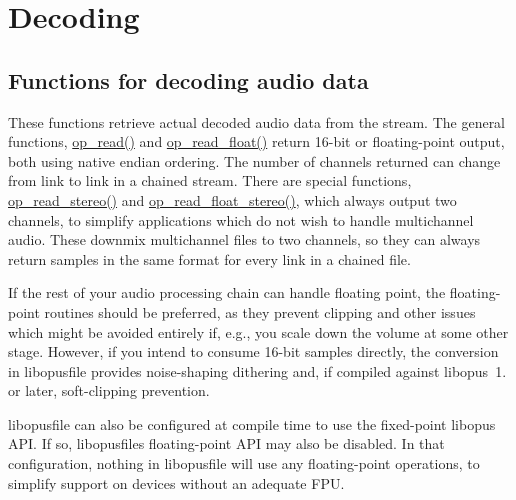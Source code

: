 \hypertarget{group__stream__decoding}{}\section{Decoding}
\label{group__stream__decoding}
\subsection*{Functions for decoding audio data}
\label{_amgrp226a9332d44ee54e9c863d78e0829f0d}%
These functions retrieve actual decoded audio data from the stream. The general functions, \mbox{\hyperlink{group__stream__decoding_ga963c917749335e29bb2b698c1cb20a10}{op\+\_\+read()}} and \mbox{\hyperlink{group__stream__decoding_ga73493002d84a234f5e19b70f1dddbe2a}{op\+\_\+read\+\_\+float()}} return 16-\/bit or floating-\/point output, both using native endian ordering. The number of channels returned can change from link to link in a chained stream. There are special functions, \mbox{\hyperlink{group__stream__decoding_gaaca17ad3fd6430dc8fd43308149428eb}{op\+\_\+read\+\_\+stereo()}} and \mbox{\hyperlink{group__stream__decoding_ga9736f96563500c0978f56f0fd6bdad83}{op\+\_\+read\+\_\+float\+\_\+stereo()}}, which always output two channels, to simplify applications which do not wish to handle multichannel audio. These downmix multichannel files to two channels, so they can always return samples in the same format for every link in a chained file.

If the rest of your audio processing chain can handle floating point, the floating-\/point routines should be preferred, as they prevent clipping and other issues which might be avoided entirely if, e.\+g., you scale down the volume at some other stage. However, if you intend to consume 16-\/bit samples directly, the conversion in {\ttfamily libopusfile} provides noise-\/shaping dithering and, if compiled against {\ttfamily libopus}~1. or later, soft-\/clipping prevention.

{\ttfamily libopusfile} can also be configured at compile time to use the fixed-\/point {\ttfamily libopus} A\+PI. If so, {\ttfamily libopusfile}\textquotesingle{}s floating-\/point A\+PI may also be disabled. In that configuration, nothing in {\ttfamily libopusfile} will use any floating-\/point operations, to simplify support on devices without an adequate F\+PU.

